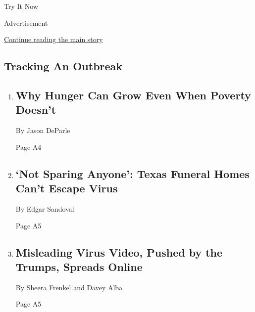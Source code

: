 Try It Now

Advertisement

\protect\hyperlink{after-mid1}{Continue reading the main story}

\hypertarget{tracking-an-outbreak}{%
\subsection{Tracking An Outbreak}\label{tracking-an-outbreak}}

\begin{enumerate}
\def\labelenumi{\arabic{enumi}.}
\item
  \href{/2020/07/28/us/politics/coronavirus-hunger-poverty.html}{}

  \hypertarget{why-hunger-can-grow-even-when-poverty-doesnt}{%
  \subsection{Why Hunger Can Grow Even When Poverty
  Doesn't}\label{why-hunger-can-grow-even-when-poverty-doesnt}}

  By Jason DeParle

  Page A4
\item
  \href{/2020/07/28/us/coronavirus-texas-funeral-homes.html}{}

  \hypertarget{not-sparing-anyone-texas-funeral-homes-cant-escape-virus-1}{%
  \subsection{`Not Sparing Anyone': Texas Funeral Homes Can't Escape
  Virus}\label{not-sparing-anyone-texas-funeral-homes-cant-escape-virus-1}}

  By Edgar Sandoval

  Page A5
\item
  \href{/2020/07/28/technology/virus-video-trump.html}{}

  \hypertarget{misleading-virus-video-pushed-by-the-trumps-spreads-online-1}{%
  \subsection{Misleading Virus Video, Pushed by the Trumps, Spreads
  Online}\label{misleading-virus-video-pushed-by-the-trumps-spreads-online-1}}

  By Sheera Frenkel and Davey Alba

  Page A5
\end{enumerate}

